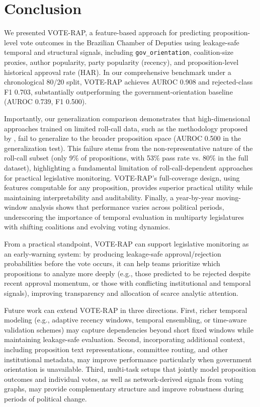 \documentclass[review]{elsarticle}
\begin{document}
\section{Conclusion}
\label{conclusion}

We presented VOTE-RAP, a feature-based approach for predicting proposition-level vote outcomes in the Brazilian Chamber of Deputies using leakage-safe temporal and structural signals, including \texttt{gov\_\allowbreak orientation}, coalition-size proxies, author popularity, party popularity (recency), and proposition-level historical approval rate (HAR). In our comprehensive benchmark under a chronological 80/20 split, VOTE-RAP achieves AUROC 0.908 and rejected-class F1 0.703, substantially outperforming the government-orientation baseline (AUROC 0.739, F1 0.500). 

Importantly, our generalization comparison demonstrates that high-dimensional approaches trained on limited roll-call data, such as the methodology proposed by \citet{Albuquerque2025Forecasting}, fail to generalize to the broader proposition space (AUROC 0.500 in the generalization test). This failure stems from the non-representative nature of the roll-call subset (only 9\% of propositions, with 53\% pass rate vs. 80\% in the full dataset), highlighting a fundamental limitation of roll-call-dependent approaches for practical legislative monitoring. VOTE-RAP's full-coverage design, using features computable for any proposition, provides superior practical utility while maintaining interpretability and auditability. Finally, a year-by-year moving-window analysis shows that performance varies across political periods, underscoring the importance of temporal evaluation in multiparty legislatures with shifting coalitions and evolving voting dynamics.

\par
From a practical standpoint, VOTE-RAP can support legislative monitoring as an early-warning system: by producing leakage-safe approval/rejection probabilities before the vote occurs, it can help teams prioritize which propositions to analyze more deeply (e.g., those predicted to be rejected despite recent approval momentum, or those with conflicting institutional and temporal signals), improving transparency and allocation of scarce analytic attention.

Future work can extend VOTE-RAP in three directions. First, richer temporal modeling (e.g., adaptive recency windows, temporal ensembling, or time-aware validation schemes) may capture dependencies beyond short fixed windows while maintaining leakage-safe evaluation. Second, incorporating additional context, including proposition text representations, committee routing, and other institutional metadata, may improve performance particularly when government orientation is unavailable. Third, multi-task setups that jointly model proposition outcomes and individual votes, as well as network-derived signals from voting graphs, may provide complementary structure and improve robustness during periods of political change.
\end{document}
